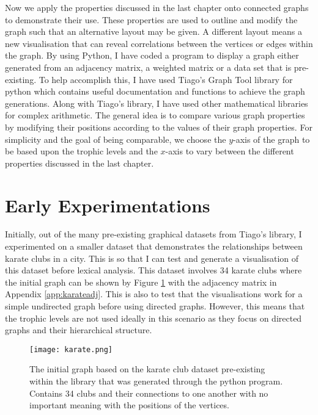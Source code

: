 Now we apply the properties discussed in the last chapter onto connected graphs to demonstrate their use. These properties are used to outline and modify the graph such that an alternative layout may be given. A different layout means a new visualisation that can reveal correlations between the vertices or edges within the graph. By using Python, I have coded a program to display a graph either generated from an adjacency matrix, a weighted matrix or a data set that is pre-existing. To help accomplish this, I have used Tiago's Graph Tool library for python which contains useful documentation and functions to achieve the graph generations. Along with Tiago's library, I have used other mathematical libraries for complex arithmetic. The general idea is to compare various graph properties by modifying their positions according to the values of their graph properties. For simplicity and the goal of being comparable, we choose the $y$-axis of the graph to be based upon the trophic levels and the $x$-axis to vary between the different properties discussed in the last chapter.

\section{Early Experimentations}
Initially, out of the many pre-existing graphical datasets from Tiago's library, I experimented on a smaller dataset that demonstrates the relationships between karate clubs in a city. This is so that I can test and generate a visualisation of this dataset before lexical analysis. This dataset involves 34 karate clubs where the initial graph can be shown by Figure \ref{fig:karate} with the adjacency matrix in Appendix \ref{app:karateadj}. This is also to test that the visualisations work for a simple undirected graph before using directed graphs. However, this means that the trophic levels are not used ideally in this scenario as they focus on directed graphs and their hierarchical structure.

\begin{figure}[!htb]
	\centering
	\texttt{[image: karate.png]}
	\caption{The initial graph based on the karate club dataset pre-existing within the library that was generated through the python program. Contains 34 clubs and their connections to one another with no important meaning with the positions of the vertices.}
	\label{fig:karate}
\end{figure}

